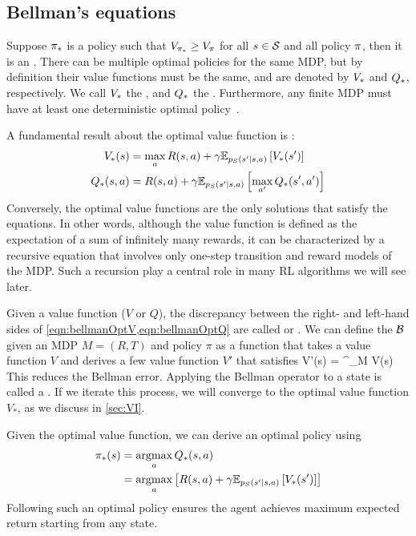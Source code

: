 \subsection{Bellman's equations}
\label{sec:optPolicy}
\label{sec:bellman}
\label{sec:Bellman}

Suppose $\pi_{*}$ is a policy such that $V_{\pi_{*}} \ge V_{\pi}$ for all $s \in \mathcal{S}$ and all policy $\pi$, then it is an .
There can be multiple optimal policies for the same MDP, but by definition their value functions must be the same, and are denoted by $V_{*}$ and $Q_{*}$, respectively.
We call $V_{*}$ the , and $Q_{*}$ the .
Furthermore, any finite MDP must have at least one deterministic optimal policy~\citep{Puterman94}.

A fundamental result about the optimal value function is
:
\begin{align}
  \Vopt(s) &=
   \max_a R(s,a) + \gamma \expectQ{\Vopt(s')}{\ptran(s'|s,a)} 
\label{eqn:bellmanOptV} \\
    \Qopt(s,a) &= R(s,a) + \gamma  \expectQ{\max_{a'} \Qopt(s',a')}{\ptran(s'|s,a)}
    \label{eqn:bellmanOptQ}
\end{align}
Conversely, the optimal value functions are the only solutions that satisfy the equations.
In other words, although the value function is defined as the
expectation of a sum of infinitely many rewards, it can be
characterized by a recursive equation
that involves only one-step transition and reward models of the MDP.
Such a recursion play a central role in many RL algorithms we will see later.

Given a value function ($V$ or $Q$),
the discrepancy between 
the right- and left-hand sides of
\cref{eqn:bellmanOptV,eqn:bellmanOptQ}
are called 
or .
We can define the 
$\mathcal{B}$ given an MDP $M=(R,T)$ and policy $\pi$
as a function that takes a value function $V$
and derives a few value function $V'$ that satisfies
\be
V'(s) = \calB^{\pi}_{M} V(s)
 {}
\ee
This reduces the Bellman error.
Applying the Bellman operator to a state is called a
.
If we iterate this process, we will converge to the optimal
value function $V_*$, as we discuss in \cref{sec:VI}.

Given the optimal value function, we can derive an optimal policy using
\begin{align}
\polopt(s) &= \argmax_a \Qopt(s,a)
\label{eqn:optPolFromQ} \\
  &= \argmax_a \left[ R(s,a) + \gamma \expectQ{\Vopt(s')}{\ptran(s'|s,a)} \right]
\label{eqn:optPolFromV}
\end{align}
Following such an optimal policy ensures
the agent achieves maximum expected return
starting from any state. 

